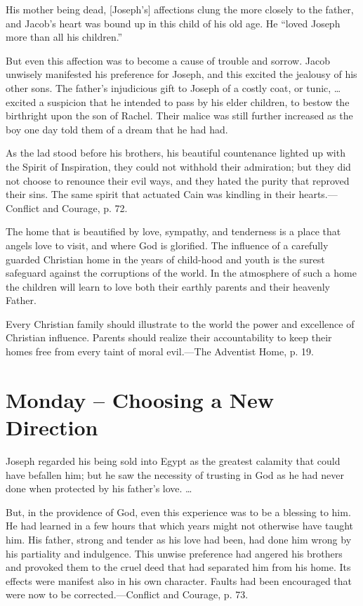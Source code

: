 \documentclass[a4paper, 10pt, twoside, headings=small]{scrartcl}
\begin{document}
\begin{multicols}{2}
His mother being dead, [Joseph’s] affections clung the more closely to the father, and Jacob’s heart was bound up in this child of his old age. He “loved Joseph more than all his children.”

But even this affection was to become a cause of trouble and sorrow. Jacob unwisely manifested his preference for Joseph, and this excited the jealousy of his other sons. The father’s injudicious gift to Joseph of a costly coat, or tunic, … excited a suspicion that he intended to pass by his elder children, to bestow the birthright upon the son of Rachel. Their malice was still further increased as the boy one day told them of a dream that he had had.

As the lad stood before his brothers, his beautiful countenance lighted up with the Spirit of Inspiration, they could not withhold their admiration; but they did not choose to renounce their evil ways, and they hated the purity that reproved their sins. The same spirit that actuated Cain was kindling in their hearts.—Conflict and Courage, p. 72.

The home that is beautified by love, sympathy, and tenderness is a place that angels love to visit, and where God is glorified. The influence of a carefully guarded Christian home in the years of child-hood and youth is the surest safeguard against the corruptions of the world. In the atmosphere of such a home the children will learn to love both their earthly parents and their heavenly Father.

Every Christian family should illustrate to the world the power and excellence of Christian influence. Parents should realize their accountability to keep their homes free from every taint of moral evil.—The Adventist Home, p. 19.

\section*{Monday – Choosing a New Direction}

Joseph regarded his being sold into Egypt as the greatest calamity that could have befallen him; but he saw the necessity of trusting in God as he had never done when protected by his father’s love. …

But, in the providence of God, even this experience was to be a blessing to him. He had learned in a few hours that which years might not otherwise have taught him. His father, strong and tender as his love had been, had done him wrong by his partiality and indulgence. This unwise preference had angered his brothers and provoked them to the cruel deed that had separated him from his home. Its effects were manifest also in his own character. Faults had been encouraged that were now to be corrected.—Conflict and Courage, p. 73.


\end{multicols}
\end{document}

